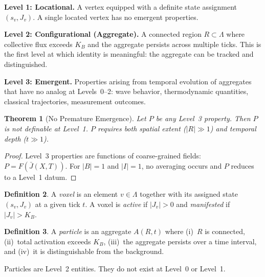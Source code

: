 \documentclass[12pt]{article}
\theoremstyle{plain}
\newtheorem{theorem}{Theorem}[section]
\theoremstyle{definition}
\newtheorem{definition}[theorem]{Definition}
\theoremstyle{remark}
\newcommand{\Lattice}{\Lambda}
\newcommand{\KB}{K_B}
\begin{document}
\medskip
\noindent\textbf{Level 1: Locational.} A vertex equipped with a definite state assignment $(s_v, J_v)$. A single located vertex has no emergent properties.

\medskip
\noindent\textbf{Level 2: Configurational (Aggregate).} A connected region $R \subset \Lattice$ where collective flux exceeds $\KB$ and the aggregate persists across multiple ticks. This is the first level at which identity is meaningful: the aggregate can be tracked and distinguished.

\medskip
\noindent\textbf{Level 3: Emergent.} Properties arising from temporal evolution of aggregates that have no analog at Levels~0--2: wave behavior, thermodynamic quantities, classical trajectories, measurement outcomes.

\begin{theorem}[No Premature Emergence]\label{thm:emergence}
Let $P$ be any Level~3 property. Then $P$ is not definable at Level~1. $P$ requires both spatial extent ($|R| \gg 1$) and temporal depth ($t \gg 1$).
\end{theorem}

\begin{proof}
Level~3 properties are functions of coarse-grained fields: $P = F(\bar{J}(X,T))$. For $|B| = 1$ and $|I| = 1$, no averaging occurs and $P$ reduces to a Level~1 datum.
\end{proof}

\begin{definition}\label{def:voxel}
A \emph{voxel} is an element $v \in \Lattice$ together with its assigned state $(s_v, J_v)$ at a given tick $t$. A voxel is \emph{active} if $|J_v| > 0$ and \emph{manifested} if $|J_v| > \KB$.
\end{definition}

\begin{definition}\label{def:particle}
A \emph{particle} is an aggregate $A(R,t)$ where (i)~$R$ is connected, (ii)~total activation exceeds $\KB$, (iii)~the aggregate persists over a time interval, and (iv)~it is distinguishable from the background.
\end{definition}

Particles are Level~2 entities. They do not exist at Level~0 or Level~1.


\end{document}
